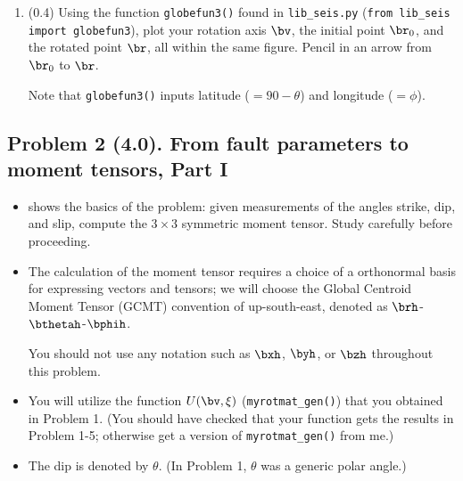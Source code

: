 \documentclass[11pt,titlepage,fleqn]{article}
\newcommand{\rotangB}{\xi}    %
\newcommand{\rotvec}{\bv}      %
\newcommand{\Umat}{U}
\begin{document}
\begin{enumerate}
\item (0.4) Using the function \verb+globefun3()+ found in \verb+lib_seis.py+ (\verb+from lib_seis import globefun3+), plot your rotation axis $\rotvec$, the initial point $\br_0$, and the rotated point $\br$, all within the same figure. Pencil in an arrow from $\br_0$ to $\br$.

Note that \verb+globefun3()+ inputs latitude ($=90-\theta$) and longitude ($=\phi$).

\end{enumerate}


\subsection*{Problem 2 (4.0). From fault parameters to moment tensors, Part I}

\begin{itemize}
\item {} shows the basics of the problem: given measurements of the angles strike, dip, and slip, compute the $3 \times 3$ symmetric moment tensor. Study  carefully before proceeding.

\item The calculation of the moment tensor requires a choice of a orthonormal basis for expressing vectors and tensors; we will choose the Global Centroid Moment Tensor (GCMT) convention of up-south-east, denoted as $\brh$-$\bthetah$-$\bphih$.

You should not use any notation such as $\bxh$, $\byh$, or $\bzh$ throughout this problem.

\item You will utilize the function $\Umat(\rotvec,\rotangB)$ (\verb+myrotmat_gen()+) that you obtained in Problem 1. (You should have checked that your function gets the results in Problem 1-5; otherwise get a version of \verb+myrotmat_gen()+ from me.)

\item The dip is denoted by $\theta$. (In Problem 1, $\theta$ was a generic polar angle.)

\end{itemize}
\end{document}
